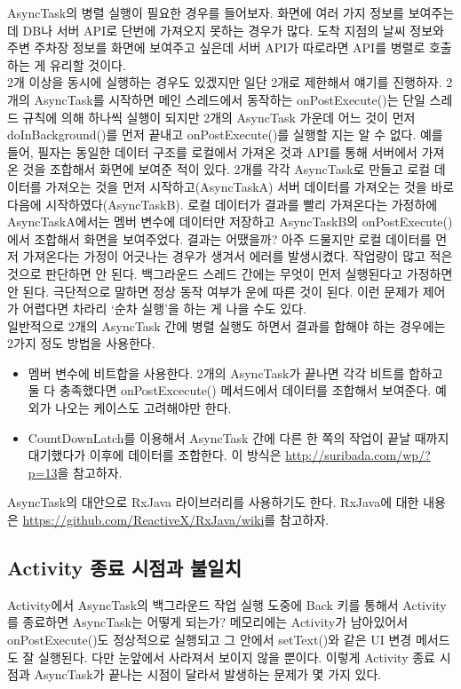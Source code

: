AsyncTask의 병렬 실행이 필요한 경우를 들어보자. 
화면에 여러 가지 정보를 보여주는 데 DB나 서버 API로 단번에 가져오지 못하는 경우가 많다. 도착 지점의 날씨 정보와 주변 주차장 정보를 화면에 보여주고 싶은데 서버 API가 따로라면 API를 병렬로 호출하는 게 유리할 것이다.\\

2개 이상을 동시에 실행하는 경우도 있겠지만 일단 2개로 제한해서 얘기를 진행하자.   
2개의 AsyncTask를 시작하면 메인 스레드에서 동작하는 onPostExecute()는 단일 스레드 규칙에 의해 하나씩 실행이 되지만 2개의 AsyncTask 가운데 어느 것이 먼저 doInBackground()를 먼저 끝내고 onPostExecute()를 실행할 지는 알 수 없다. 
예를 들어, 필자는 동일한 데이터 구조를 로컬에서 가져온 것과 API를 통해 서버에서 가져온 것을 조합해서 화면에 보여준 적이 있다. 
2개를 각각 AsyncTask로 만들고 로컬 데이터를 가져오는 것을 먼저 시작하고(AsyncTaskA) 서버 데이터를 가져오는 것을 바로 다음에 시작하였다(AsyncTaskB). 
로컬 데이터가 결과를 빨리 가져온다는 가정하에 AsyncTaskA에서는 멤버 변수에 데이터만 저장하고 AsyncTaskB의 onPostExecute()에서 조합해서 화면을 보여주었다.
결과는 어땠을까? 아주 드물지만 로컬 데이터를 먼저 가져온다는 가정이 어긋나는 경우가 생겨서 에러를 발생시켰다. 
작업량이 많고 적은 것으로 판단하면 안 된다.
백그라운드 스레드 간에는 무엇이 먼저 실행된다고 가정하면 안 된다. 극단적으로 말하면 정상 동작 여부가 운에 따른 것이 된다.
이런 문제가 제어가 어렵다면 차라리 `순차 실행'을 하는 게 나을 수도 있다.\\

일반적으로 2개의 AsyncTask 간에 병렬 실행도 하면서 결과를 합해야 하는 경우에는 2가지 정도 방법을 사용한다.
\begin{itemize}
\item 멤버 변수에 비트합을 사용한다. 2개의 AsyncTask가 끝나면 각각 비트를 합하고 둘 다 충족했다면 onPostExcecute() 메서드에서 데이터를 조합해서 보여준다. 예외가 나오는 케이스도 고려해야만 한다. 
\item CountDownLatch를 이용해서 AsyncTask 간에 다른 한 쪽의 작업이 끝날 때까지 대기했다가 이후에 데이터를 조합한다. 이 방식은 \url{http://suribada.com/wp/?p=13}을 참고하자.
\end{itemize}

AsyncTask의 대안으로 RxJava 라이브러리를 사용하기도 한다. RxJava에 대한 내용은 \url{https://github.com/ReactiveX/RxJava/wiki}를 참고하자.

\subsection{Activity 종료 시점과 불일치}
Activity에서 AsyncTask의 백그라운드 작업 실행 도중에 Back 키를 통해서 Activity를 종료하면 AsyncTask는 어떻게 되는가? 메모리에는 Activity가 남아있어서 onPostExecute()도 정상적으로 실행되고 그 안에서 setText()와 같은 UI 변경 메서드도 잘 실행된다. 다만 눈앞에서 사라져서 보이지 않을 뿐이다.
이렇게 Activity 종료 시점과 AsyncTask가 끝나는 시점이 달라서 발생하는 문제가 몇 가지 있다.\\

